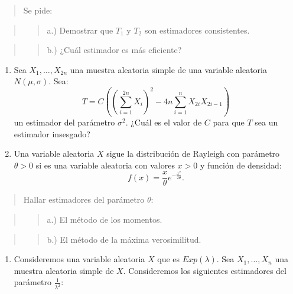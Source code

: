 \documentclass[]{article}
\providecommand{\tightlist}{%
  \setlength{\itemsep}{0pt}\setlength{\parskip}{0pt}}
\begin{document}
\begin{quote}
Se pide:
\end{quote}

\begin{quote}
\begin{quote}
a.) Demostrar que \(T_1\) y \(T_2\) son estimadores consistentes.
\end{quote}
\end{quote}

\begin{quote}
\begin{quote}
b.) ¿Cuál estimador es más eficiente?
\end{quote}
\end{quote}

\begin{enumerate}
\def\labelenumi{\arabic{enumi}.}
\setcounter{enumi}{14}
\item
  Sea \(X_1,\ldots,X_{2n}\) una muestra aleatoria simple de una variable
  aleatoria \(N(\mu,\sigma)\). Sea: \[
  T=C\left({\left(\sum_{i=1}^{2n} X_i\right)}^2- 4 n\sum_{i=1}^{n}
  X_{2i} X_{2i-1}\right)
  \] un estimador del parámetro \(\sigma^2\). ¿Cuál es el valor de \(C\)
  para que \(T\) sea un estimador insesgado?
\item
  Una variable aleatoria \(X\) sigue la distribución de Rayleigh con
  parámetro \(\theta >0\) si es una variable aleatoria con valores
  \(x>0\) y función de densidad: \[
  f(x)=\frac{x}{\theta} e^{-\frac{x^2}{2\theta}}.
  \]
\end{enumerate}

\begin{quote}
Hallar estimadores del parámetro \(\theta\):
\end{quote}

\begin{quote}
\begin{quote}
a.) El método de los momentos.
\end{quote}
\end{quote}

\begin{quote}
\begin{quote}
b.) El método de la máxima verosimilitud.
\end{quote}
\end{quote}

\begin{enumerate}
\def\labelenumi{\arabic{enumi}.}
\setcounter{enumi}{16}
\tightlist
\item
  Consideremos una variable aleatoria \(X\) que es \(Exp(\lambda)\). Sea
  \(X_1,\ldots,X_n\) una muestra aleatoria simple de \(X\). Consideremos
  los siguientes estimadores del parámetro \(\frac{1}{\lambda^2}\):
\end{enumerate}
\end{document}
